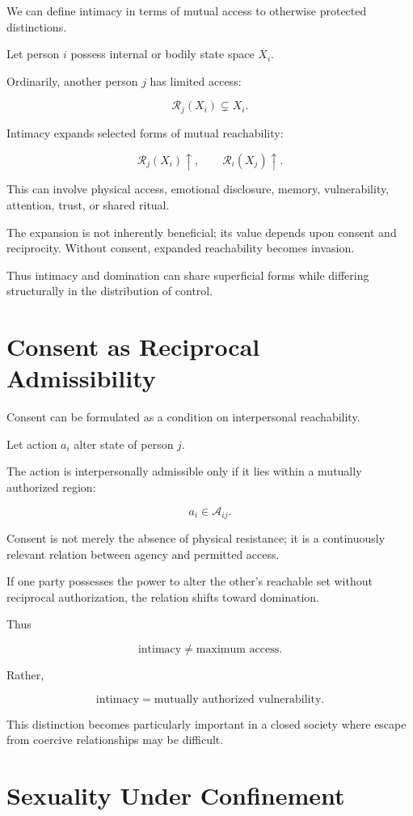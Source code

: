 \documentclass[11pt,oneside]{book}
\theoremstyle{definition}
\theoremstyle{remark}
\newcommand{\A}{\mathcal{A}}
\newcommand{\R}{\mathcal{R}}
\begin{document}
We can define intimacy in terms of mutual access to otherwise protected distinctions.

Let person \(i\) possess internal or bodily state space \(X_i\).

Ordinarily, another person \(j\) has limited access:

\[
\R_j(X_i)
\subsetneq
X_i.
\]

Intimacy expands selected forms of mutual reachability:

\[
\R_j(X_i)\uparrow,
\qquad
\R_i(X_j)\uparrow.
\]

This can involve physical access, emotional disclosure, memory, vulnerability, attention, trust, or shared ritual.

The expansion is not inherently beneficial; its value depends upon consent and reciprocity. Without consent, expanded reachability becomes invasion.

Thus intimacy and domination can share superficial forms while differing structurally in the distribution of control.

\section{Consent as Reciprocal Admissibility}

Consent can be formulated as a condition on interpersonal reachability.

Let action \(a_i\) alter state of person \(j\).

The action is interpersonally admissible only if it lies within a mutually authorized region:

\[
a_i
\in
\A_{ij}.
\]

Consent is not merely the absence of physical resistance; it is a continuously relevant relation between agency and permitted access.

If one party possesses the power to alter the other's reachable set without reciprocal authorization, the relation shifts toward domination.

Thus

\[
\text{intimacy}
\neq
\text{maximum access}.
\]

Rather,

\[
\text{intimacy}
=
\text{mutually authorized vulnerability}.
\]

This distinction becomes particularly important in a closed society where escape from coercive relationships may be difficult.

\section{Sexuality Under Confinement}
\end{document}
